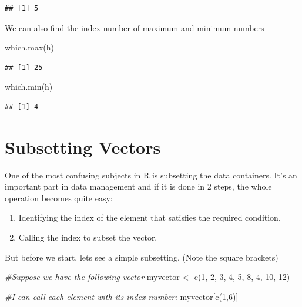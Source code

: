 \documentclass[
]{book}
\newenvironment{Shaded}{\begin{snugshade}}{\end{snugshade}}
\newcommand{\CommentTok}[1]{\textcolor[rgb]{0.56,0.35,0.01}{\textit{#1}}}
\newcommand{\DecValTok}[1]{\textcolor[rgb]{0.00,0.00,0.81}{#1}}
\newcommand{\FunctionTok}[1]{\textcolor[rgb]{0.00,0.00,0.00}{#1}}
\newcommand{\NormalTok}[1]{#1}
\newcommand{\OtherTok}[1]{\textcolor[rgb]{0.56,0.35,0.01}{#1}}
\providecommand{\tightlist}{%
  \setlength{\itemsep}{0pt}\setlength{\parskip}{0pt}}
\begin{document}
\begin{verbatim}
## [1] 5
\end{verbatim}

We can also find the index number of maximum and minimum numbers

\begin{Shaded}
\begin{Highlighting}[]
\FunctionTok{which.max}\NormalTok{(h)}
\end{Highlighting}
\end{Shaded}

\begin{verbatim}
## [1] 25
\end{verbatim}

\begin{Shaded}
\begin{Highlighting}[]
\FunctionTok{which.min}\NormalTok{(h)}
\end{Highlighting}
\end{Shaded}

\begin{verbatim}
## [1] 4
\end{verbatim}

\hypertarget{subsetting-vectors}{%
\section{Subsetting Vectors}\label{subsetting-vectors}}

One of the most confusing subjects in R is subsetting the data containers. It's an important part in data management and if it is done in 2 steps, the whole operation becomes quite easy:

\begin{enumerate}
\def\labelenumi{\arabic{enumi}.}
\tightlist
\item
  Identifying the index of the element that satisfies the required condition,
\item
  Calling the index to subset the vector.
\end{enumerate}

But before we start, lets see a simple subsetting. (Note the square brackets)

\begin{Shaded}
\begin{Highlighting}[]
\CommentTok{\#Suppose we have the following vector}
\NormalTok{myvector }\OtherTok{\textless{}{-}} \FunctionTok{c}\NormalTok{(}\DecValTok{1}\NormalTok{, }\DecValTok{2}\NormalTok{, }\DecValTok{3}\NormalTok{, }\DecValTok{4}\NormalTok{, }\DecValTok{5}\NormalTok{, }\DecValTok{8}\NormalTok{, }\DecValTok{4}\NormalTok{, }\DecValTok{10}\NormalTok{, }\DecValTok{12}\NormalTok{)}

\CommentTok{\#I can call each element with its index number:}
\NormalTok{myvector[}\FunctionTok{c}\NormalTok{(}\DecValTok{1}\NormalTok{,}\DecValTok{6}\NormalTok{)]}
\end{Highlighting}
\end{Shaded}
\end{document}
